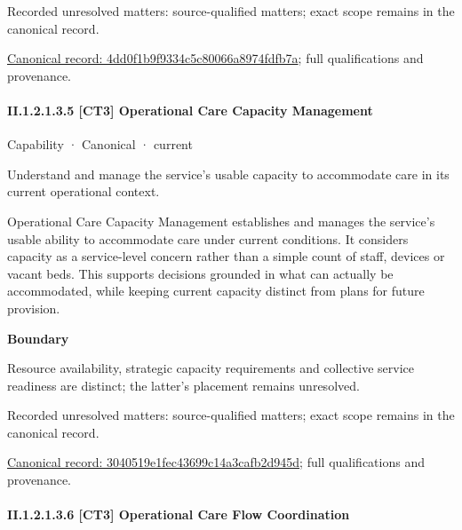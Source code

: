 {\small Recorded unresolved matters: source-qualified matters; exact scope remains in the canonical record.}\par
{\footnotesize \href{../../../../../../../continuum/strategy/capability/4dd0f1b9f9334c5c80066a8974fdfb7a.md}{Canonical record: 4dd0f1b9f9334c5c80066a8974fdfb7a}; full qualifications and provenance.}\par
\paragraph*{II.1.2.1.3.5 [CT3] Operational Care Capacity Management}
\label{navigation:II.1.2.1.3.5}

\label{element:3040519e1fec43699c14a3cafb2d945d}
{\small Capability · Canonical · current}\par

Understand and manage the service’s usable capacity to accommodate care in its current operational context.



Operational Care Capacity Management establishes and manages the service's usable ability to accommodate care under current conditions. It considers capacity as a service-level concern rather than a simple count of staff, devices or vacant beds. This supports decisions grounded in what can actually be accommodated, while keeping current capacity distinct from plans for future provision.



\textbf{Boundary}



Resource availability, strategic capacity requirements and collective service readiness are distinct; the latter's placement remains unresolved.


{\small Recorded unresolved matters: source-qualified matters; exact scope remains in the canonical record.}\par
{\footnotesize \href{../../../../../../../continuum/strategy/capability/3040519e1fec43699c14a3cafb2d945d.md}{Canonical record: 3040519e1fec43699c14a3cafb2d945d}; full qualifications and provenance.}\par
\paragraph*{II.1.2.1.3.6 [CT3] Operational Care Flow Coordination}
\label{navigation:II.1.2.1.3.6}

